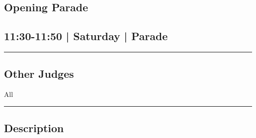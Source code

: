 \documentclass[10pt, A5]{article}
\begin{document}
		\begin{framed}
			\begin{minipage}{\textwidth}

			\setcounter{section}{22}
							\section{Opening Parade}
						
			\subsection*{11:30-11:50 | Saturday | Parade}

			\vspace{0.25cm}
			\hrule
			\vspace{0.25cm}


			\subsection*{Other Judges}
							All

					\vspace{0.25cm}
			\hrule
			\vspace{0.25cm}

			\begin{minipage}{\textwidth}
			\subsection*{\faListAlt \: Description}
			
			\end{minipage}


	\end{minipage}
	\end{framed}

	
\end{document}
